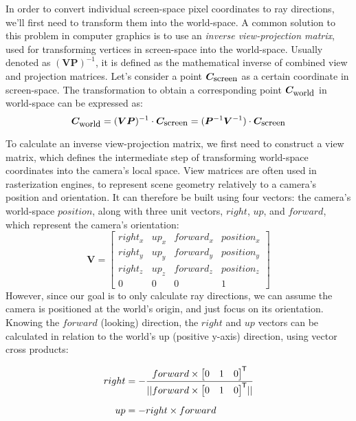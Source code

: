In order to convert individual screen-space pixel coordinates to ray directions, we'll first need to transform them into the world-space.
A common solution to this problem in computer graphics is to use an \textit{inverse view-projection matrix}, used for transforming vertices in screen-space into the world-space.
Usually denoted as $ (\bm{VP})^{-1} $, it is defined as the mathematical inverse of combined view and projection matrices.
Let's consider a point $ \bm{C}_{\textnormal{\small screen}} $ as a certain coordinate in screen-space.
The transformation to obtain a corresponding point $ \bm{C}_{\textnormal{\small world}} $ in world-space can be expressed as:
%
\begin{equation}
    \bm{C}_{\textnormal{\small world}} = (\bm{VP})^{-1} \cdot \bm{C}_{\textnormal{\small screen}} = (\bm{P}^{-1} \bm{V}^{-1}) \cdot \bm{C}_{\textnormal{\small screen}}
\end{equation}

To calculate an inverse view-projection matrix, we first need to construct a view matrix, which defines the intermediate step of transforming world-space coordinates into the camera's local space.
View matrices are often used in rasterization engines, to represent scene geometry relatively to a camera's position and orientation.
It can therefore be built using four vectors: the camera's world-space $ position $, along with three unit vectors, $ right $, $ up $, and $ forward $, which represent the camera's orientation:
%
\begin{equation}
    \bm{V} =
    \begin{bmatrix}
        right_x & up_x & forward_x & position_x\\
        right_y & up_y & forward_y & position_y\\
        right_z & up_z & forward_z & position_z\\
        0       & 0    & 0         & 1
    \end{bmatrix}
    \label{eq:Implementation/RayGeneration/view_matrix}
\end{equation}
%
However, since our goal is to only calculate ray directions, we can assume the camera is positioned at the world's origin, and just focus on its orientation.
Knowing the $ forward $ (looking) direction, the $ right $ and $ up $ vectors can be calculated in relation to the world's up (positive y-axis) direction, using vector cross products:  
%
{
    \newcommand*{\worldup}{\begin{bmatrix} 0 & 1 & 0 \end{bmatrix}\tran}
    \begin{align}
        right &= - \frac{forward\times\worldup}{\norm{forward\times\worldup}}\\[0.5em]
        up    &= - right \times forward
    \end{align}
    
}

